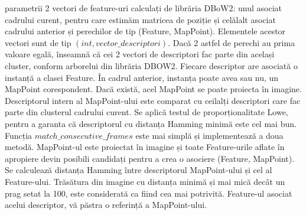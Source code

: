 \documentclass[12pt,a4paper]{report}
\begin{document}
parametrii 2 vectori de feature-uri calculați de librăria DBoW2: unul asociat cadrului curent, pentru     
care estimăm matricea de poziție și celălalt asociat cadrului anterior și perechilor de tip (Feature, MapPoint).
Elementele acestor vectori sunt de tip $ (int, vector\_descriptori) $. Dacă 2 astfel de perechi au prima valoare egală,
 înseamnă că cei 2 vectori de descriptori fac parte din același cluster, conform arborelui din librăria DBOW2.
Fiecare descriptor are asociată o instanță a clasei Feature. În cadrul anterior, instanța poate avea sau nu, un MapPoint corespondent.
Dacă există, acel MapPoint se poate proiecta în imagine. Descriptorul intern al MapPoint-ului este comparat cu ceilalți 
descriptori care fac parte din clusterul cadrului curent. Se aplică testul de proporționalitate Lowe, pentru a
garanta că descriptorul cu distanța Hamming minimă este cel mai bun. Funcția $ match\_consecutive\_frames $ este mai simplă
și implementează a doua metodă. MapPoint-ul este proiectat în imagine și toate Feature-urile aflate în apropiere devin
posibili candidați pentru a crea o asociere (Feature, MapPoint). Se calculează distanța Hamming între descriptorul 
MapPoint-ului și cel al Feature-ului. Trăsătura din imagine cu distanța minimă și mai mică decât un prag setat la 100, este 
considerată ca fiind cea mai potrivită. Feature-ul asociat acelui descriptor, vă păstra o referință a MapPoint-ului. \\
\end{document}

